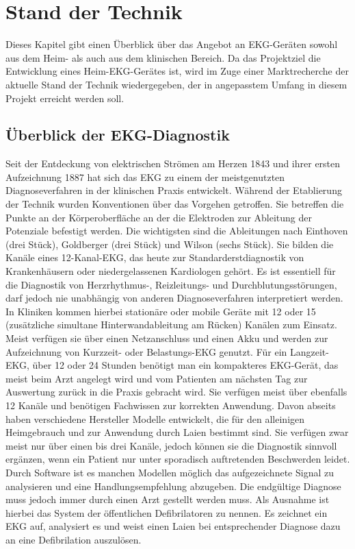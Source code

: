 
\section{Stand der Technik}

Dieses Kapitel gibt einen Überblick über das Angebot an EKG-Geräten sowohl aus dem Heim- als auch aus dem klinischen Bereich. Da das Projektziel die Entwicklung eines Heim-EKG-Gerätes ist, wird im Zuge einer Marktrecherche der aktuelle Stand der Technik wiedergegeben, der in angepasstem Umfang in diesem Projekt erreicht werden soll. 

\subsection{Überblick der EKG-Diagnostik}

Seit der Entdeckung von elektrischen Strömen am Herzen 1843 und ihrer ersten Aufzeichnung 1887 hat sich das EKG zu einem der meistgenutzten Diagnoseverfahren in der klinischen Praxis entwickelt. Während der Etablierung der Technik wurden Konventionen über das Vorgehen getroffen. Sie betreffen die Punkte an der Körperoberfläche an der die Elektroden zur Ableitung der Potenziale befestigt werden. Die wichtigsten sind die Ableitungen nach Einthoven (drei Stück), Goldberger (drei Stück) und Wilson (sechs Stück). Sie bilden die Kanäle eines 12-Kanal-EKG, das heute zur Standarderstdiagnostik von Krankenhäusern oder niedergelassenen Kardiologen gehört. Es ist essentiell für die Diagnostik von Herzrhythmus-, Reizleitungs- und Durchblutungsstörungen, darf jedoch nie unabhängig von anderen Diagnoseverfahren interpretiert werden. In Kliniken kommen hierbei stationäre oder mobile Geräte mit 12 oder 15 (zusätzliche simultane Hinterwandableitung am Rücken) Kanälen zum Einsatz. Meist verfügen sie über einen Netzanschluss und einen Akku und werden zur Aufzeichnung von Kurzzeit- oder Belastungs-EKG genutzt. Für ein Langzeit-EKG, über 12 oder 24 Stunden benötigt man ein kompakteres EKG-Gerät, das meist beim Arzt angelegt wird und vom Patienten am nächsten Tag zur Auswertung zurück in die Praxis gebracht wird. Sie verfügen meist über ebenfalls 12 Kanäle und benötigen Fachwissen zur korrekten Anwendung. Davon abseits haben verschiedene Hersteller Modelle entwickelt, die für den alleinigen Heimgebrauch und zur Anwendung durch Laien bestimmt sind. Sie verfügen zwar meist nur über einen bis drei Kanäle, jedoch können sie die Diagnostik sinnvoll ergänzen, wenn ein Patient nur unter sporadisch auftretenden Beschwerden leidet. Durch Software ist es manchen Modellen möglich das aufgezeichnete Signal zu analysieren und eine Handlungsempfehlung abzugeben. Die endgültige Diagnose muss jedoch immer durch einen Arzt gestellt werden muss. Als Ausnahme ist hierbei das System der öffentlichen Defibrilatoren zu nennen. Es zeichnet ein EKG auf, analysiert es und weist einen Laien bei entsprechender Diagnose dazu an eine Defibrilation auszulösen.


